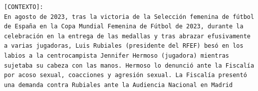 

\begin{lstlisting}
[CONTEXTO]: 
En agosto de 2023, tras la victoria de la Selección femenina de fútbol de España en la Copa Mundial Femenina de Fútbol de 2023, durante la celebración en la entrega de las medallas y tras abrazar efusivamente a varias jugadoras, Luis Rubiales (presidente del RFEF) besó en los labios a la centrocampista Jennifer Hermoso (jugadora) mientras sujetaba su cabeza con las manos. Hermoso lo denunció ante la Fiscalía por acoso sexual, coacciones y agresión sexual. La Fiscalía presentó una demanda contra Rubiales ante la Audiencia Nacional en Madrid
\end{lstlisting}
\newpage